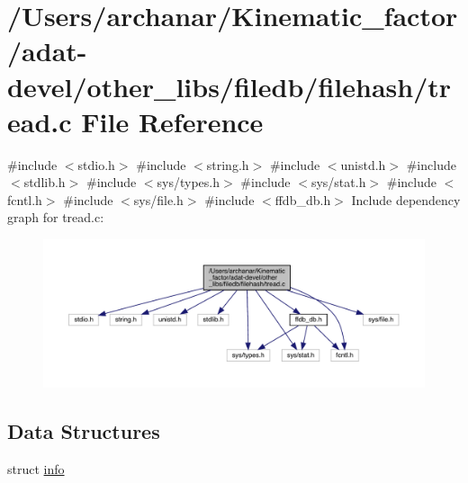 \hypertarget{adat-devel_2other__libs_2filedb_2filehash_2tread_8c}{}\section{/\+Users/archanar/\+Kinematic\+\_\+factor/adat-\/devel/other\+\_\+libs/filedb/filehash/tread.c File Reference}
\label{adat-devel_2other__libs_2filedb_2filehash_2tread_8c}
{\ttfamily \#include $<$stdio.\+h$>$}\newline
{\ttfamily \#include $<$string.\+h$>$}\newline
{\ttfamily \#include $<$unistd.\+h$>$}\newline
{\ttfamily \#include $<$stdlib.\+h$>$}\newline
{\ttfamily \#include $<$sys/types.\+h$>$}\newline
{\ttfamily \#include $<$sys/stat.\+h$>$}\newline
{\ttfamily \#include $<$fcntl.\+h$>$}\newline
{\ttfamily \#include $<$sys/file.\+h$>$}\newline
{\ttfamily \#include $<$ffdb\+\_\+db.\+h$>$}\newline
Include dependency graph for tread.\+c\+:
\nopagebreak
\begin{figure}[H]
\begin{center}
\leavevmode
\includegraphics[width=350pt]{df/d10/adat-devel_2other__libs_2filedb_2filehash_2tread_8c__incl}
\end{center}
\end{figure}
\subsection*{Data Structures}
\begin{DoxyCompactItemize}
\item 
struct \mbox{\hyperlink{structinfo}{info}}
\end{DoxyCompactItemize}
